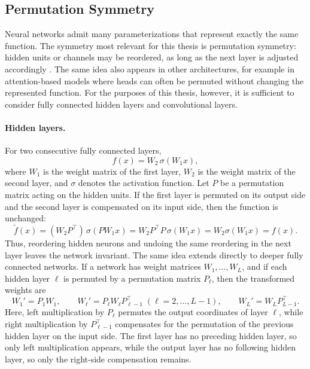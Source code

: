 \documentclass[11pt,a4paper]{report}
\begin{document}
\subsection{Permutation Symmetry}

Neural networks admit many parameterizations that represent exactly the same function. The symmetry most relevant for this thesis is permutation symmetry: hidden units or channels may be reordered, as long as the next layer is adjusted accordingly \citep{hechtnielsen1990algebraic}. The same idea also appears in other architectures, for example in attention-based models where heads can often be permuted without changing the represented function. For the purposes of this thesis, however, it is sufficient to consider fully connected hidden layers and convolutional layers.

\paragraph{Hidden layers.}
For two consecutive fully connected layers,
\[
f(x) = W_2 \,\sigma(W_1 x),
\]
where \(W_1\) is the weight matrix of the first layer, \(W_2\) is the weight matrix of the second layer, and \(\sigma\) denotes the activation function. Let \(P\) be a permutation matrix acting on the hidden units. If the first layer is permuted on its output side and the second layer is compensated on its input side, then the function is unchanged:
\[
\widetilde{f}(x)
=
(W_2 P^\top)\,\sigma(P W_1 x)
=
W_2 P^\top P \,\sigma(W_1 x)
=
W_2 \sigma(W_1 x)
=
f(x).
\]
Thus, reordering hidden neurons and undoing the same reordering in the next layer leaves the network invariant. The same idea extends directly to deeper fully connected networks. If a network has weight matrices \(W_1,\dots,W_L\), and if each hidden layer \(\ell\) is permuted by a permutation matrix \(P_\ell\), then the transformed weights are
\[
W_1' = P_1 W_1,\qquad
W_\ell' = P_\ell W_\ell P_{\ell-1}^{\top}\;(\ell=2,\dots,L-1),\qquad
W_L' = W_L P_{L-1}^{\top}.
\]
Here, left multiplication by \(P_\ell\) permutes the output coordinates of layer \(\ell\), while right multiplication by \(P_{\ell-1}^{\top}\) compensates for the permutation of the previous hidden layer on the input side. The first layer has no preceding hidden layer, so only left multiplication appears, while the output layer has no following hidden layer, so only the right-side compensation remains.
\end{document}
